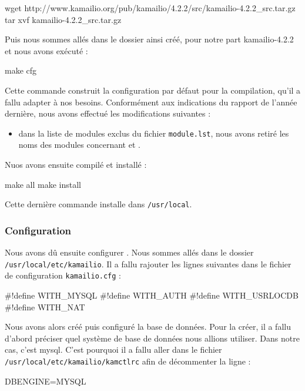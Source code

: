 \begin{shellcode}
wget http://www.kamailio.org/pub/kamailio/4.2.2/src/kamailio-4.2.2_src.tar.gz
tar xvf kamailio-4.2.2_src.tar.gz
\end{shellcode}

Puis nous sommes allés dans le dossier ainsi créé, pour notre part kamailio-4.2.2 et nous avons exécuté :

\begin{shellcode}
make cfg
\end{shellcode}

Cette commande construit la configuration par défaut pour la compilation, qu’il a fallu adapter à nos besoins. Conformément aux indications du rapport de l’année dernière, nous avons effectué les modifications suivantes :

\begin{itemize}
	\item{dans la liste de modules exclus du fichier \texttt{module.lst}, nous avons retiré les noms des modules concernant {\my} et {\rad}}.
\end{itemize}

Nuos avons ensuite compilé et installé {\kam} :
	
\begin{shellcode}
make all
make install
\end{shellcode}

Cette dernière commande installe {\kam} dans \texttt{/usr/local}.

\subsubsection{Configuration}

Nous avons dû ensuite configurer {\kam}. Nous sommes allés dans le dossier \texttt{/usr/local/etc/kamailio}. Il a fallu rajouter les lignes suivantes dans le fichier de configuration \texttt{kamailio.cfg} :

\begin{kamcf}
#!define WITH_MYSQL
#!define WITH_AUTH
#!define WITH_USRLOCDB
#!define WITH_NAT
\end{kamcf}

Nous avons alors créé puis configuré la base de données. Pour la créer, il a fallu d'abord préciser quel système de base de données nous allions utiliser.
Dans notre cas, c'est mysql. C'est pourquoi il a fallu aller dans le fichier \texttt{/usr/local/etc/kamailio/kamctlrc} afin de décommenter la ligne :

\begin{kamcf}
DBENGINE=MYSQL
\end{kamcf}


